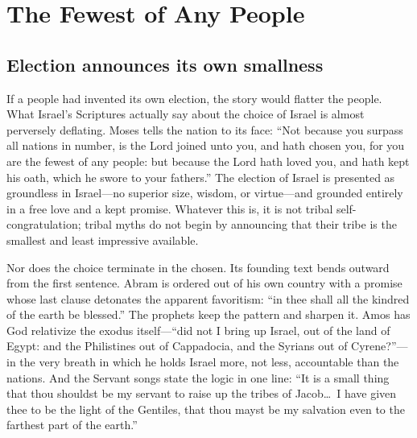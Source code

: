 \section{The Fewest of Any People}

\subsection{Election announces its own smallness}

If a people had invented its own election, the story would flatter the people. What Israel's Scriptures actually say about the choice of Israel is almost perversely deflating. Moses tells the nation to its face: ``Not because you surpass all nations in number, is the Lord joined unto you, and hath chosen you, for you are the fewest of any people: but because the Lord hath loved you, and hath kept his oath, which he swore to your fathers.'' The election of Israel is presented as groundless in Israel---no superior size, wisdom, or virtue---and grounded entirely in a free love and a kept promise. Whatever this is, it is not tribal self-congratulation; tribal myths do not begin by announcing that their tribe is the smallest and least impressive available.

Nor does the choice terminate in the chosen. Its founding text bends outward from the first sentence. Abram is ordered out of his own country with a promise whose last clause detonates the apparent favoritism: ``in thee shall all the kindred of the earth be blessed.'' The prophets keep the pattern and sharpen it. Amos has God relativize the exodus itself---``did not I bring up Israel, out of the land of Egypt: and the Philistines out of Cappadocia, and the Syrians out of Cyrene?''---in the very breath in which he holds Israel more, not less, accountable than the nations. And the Servant songs state the logic in one line: ``It is a small thing that thou shouldst be my servant to raise up the tribes of Jacob\ldots\ I have given thee to be the light of the Gentiles, that thou mayst be my salvation even to the farthest part of the earth.''

